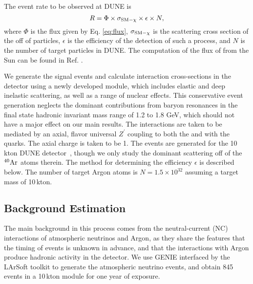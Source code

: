 The event rate to be observed at DUNE is 
\begin{equation}
R = \Phi \times \sigma_{\rm{SM} - \chi} \times \epsilon \times N,
\end{equation}
 where $\Phi$ is the flux given by Eq. \ref{eq:flux}, $\sigma_{\rm{SM} - \chi}$ is the scattering cross section of the  off of  particles, $\epsilon$ is the efficiency of the detection of such a process, and $N$ is the number of target particles in DUNE. The computation of the flux of  from the Sun can be found in Ref. \cite{Berger:2014sqa}. 
 
We generate the signal events and calculate interaction cross-sections in the detector using a newly developed  module\cite{Andreopoulos:2009rq,Andreopoulos:2015wxa,Berger:2018}, which includes elastic and deep inelastic scattering, as well as a range of nuclear effects. This conservative event generation neglects the dominant contributions from baryon resonances in the final state hadronic invariant mass range of 1.2 to 1.8 GeV, which should not have a major effect on our main results. The interactions are taken to be mediated by an axial, flavor universal $Z^\prime$ coupling to both the  and with the quarks. The axial charge is taken to be 1. 
The events are generated for the 10\,kton DUNE detector~\cite{dunetpc_code}, though we only study the dominant scattering off of the ${}^{40}{\rm Ar}$ atoms therein. The method for determining the efficiency $\epsilon$ is described below. The number of target Argon atoms is $N = 1.5  \times 10^{32}$ assuming a target mass of 10\,kton.

\subsection{Background Estimation}
\label{sec:background}

The main background in this process comes from the neutral-current (NC) 
interactions of atmospheric neutrinos and Argon,
as they share the features that the timing of events is unknown in advance,
and that the interactions with Argon produce hadronic activity in the detector.
We use GENIE\cite{Andreopoulos:2009rq,Andreopoulos:2015wxa}
interfaced by the LArSoft toolkit to generate the  atmospheric
neutrino events, and obtain 845 events in a 10\,kton module for one year of
exposure.

